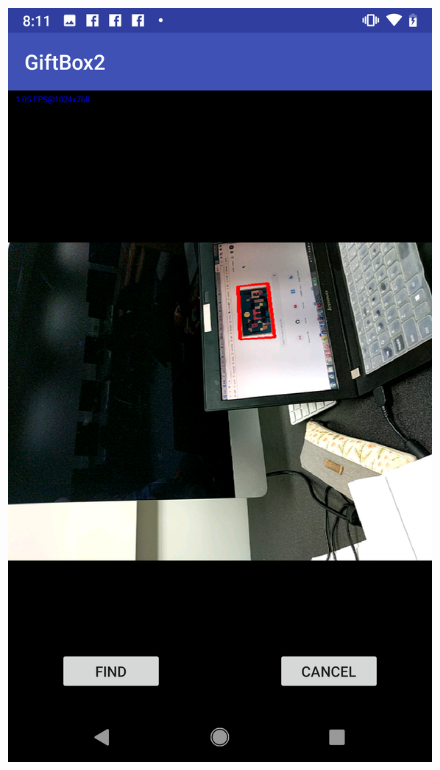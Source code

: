 \begin{figure}[htb]
\begin{minipage}[H]{0.3\textwidth}
\includegraphics[width=.95\textwidth]{section05/assets/resultExample4.png}
\subcaption{\label{DetectedRegionCorrect2}}
\end{minipage}%
\begin{minipage}[H]{0.3\textwidth}

\end{minipage}
\end{figure}
